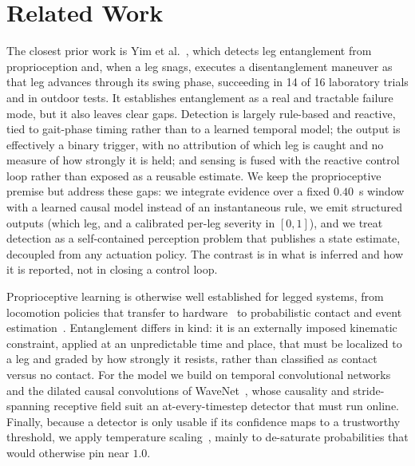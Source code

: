 \section{Related Work}

The closest prior work is Yim et al.~\cite{yim2023entanglement}, which detects leg entanglement from proprioception and, when a leg snags, executes a disentanglement maneuver as that leg advances through its swing phase, succeeding in 14 of 16 laboratory trials and in outdoor tests. It establishes entanglement as a real and tractable failure mode, but it also leaves clear gaps. Detection is largely rule-based and reactive, tied to gait-phase timing rather than to a learned temporal model; the output is effectively a binary trigger, with no attribution of which leg is caught and no measure of how strongly it is held; and sensing is fused with the reactive control loop rather than exposed as a reusable estimate. We keep the proprioceptive premise but address these gaps: we integrate evidence over a fixed $0.40$~s window with a learned causal model instead of an instantaneous rule, we emit structured outputs (which leg, and a calibrated per-leg severity in $[0,1]$), and we treat detection as a self-contained perception problem that publishes a state estimate, decoupled from any actuation policy. The contrast is in what is inferred and how it is reported, not in closing a control loop.

Proprioceptive learning is otherwise well established for legged systems, from locomotion policies that transfer to hardware~\cite{hwangbo2019learning,lee2020learning} to probabilistic contact and event estimation~\cite{camurri2017contact,bledt2018contact}. Entanglement differs in kind: it is an externally imposed kinematic constraint, applied at an unpredictable time and place, that must be localized to a leg and graded by how strongly it resists, rather than classified as contact versus no contact. For the model we build on temporal convolutional networks~\cite{bai2018tcn} and the dilated causal convolutions of WaveNet~\cite{oord2016wavenet}, whose causality and stride-spanning receptive field suit an at-every-timestep detector that must run online. Finally, because a detector is only usable if its confidence maps to a trustworthy threshold, we apply temperature scaling~\cite{guo2017calibration,niculescu2005predicting}, mainly to de-saturate probabilities that would otherwise pin near $1.0$.
